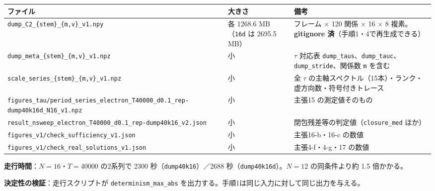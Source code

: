 \documentclass[
  10pt,
]{ltjsarticle}
\newcounter{none} %
\begin{document}
{\def\LTcaptype{none} %
\begin{longtable}[]{@{}
  >{\raggedright\arraybackslash}p{}
  >{\raggedright\arraybackslash}p{}
  >{\raggedright\arraybackslash}p{}@{}}
\toprule\noalign{}
\begin{minipage}[b]{\linewidth}\raggedright
ファイル
\end{minipage} & \begin{minipage}[b]{\linewidth}\raggedright
大きさ
\end{minipage} & \begin{minipage}[b]{\linewidth}\raggedright
備考
\end{minipage} \\
\midrule\noalign{}
\endhead
\bottomrule\noalign{}
\endlastfoot
\texttt{dump\_C2\_\{stem\}\_\{m,v\}\_v1.npy} & 各 1268.6
MB（\texttt{16d} は 2695.5 MB） & フレーム × 120 関係 × 16 × 8
複素。\textbf{gitignore 済}（手順1・4で再生成できる） \\
\texttt{dump\_meta\_\{stem\}\_\{m,v\}\_v1.npz} & 小 & \(\tau\) 対応表
\texttt{dump\_taus}、\texttt{dump\_tauc}、\texttt{dump\_stride}、関係数
\texttt{m} を含む \\
\texttt{scale\_series\_\{stem\}\_\{m,v\}\_v1.npz} & 小 & 全 \(\tau\)
の主軸スペクトル（15本）・ランク・虚方向数・符号付きトレース \\
\texttt{figures\_tau/period\_series\_electron\_T40000\_d0.1\_rep-dump40k16d\_N16\_v1.npz}
& 小 & 主張15 の測定値そのもの \\
\texttt{result\_nsweep\_electron\_T40000\_d0.1\_rep-dump40k16\_v2.json}
& 小 & 閉包残差等の判定値（\texttt{closure\_med} ほか） \\
\texttt{figures\_v1/check\_sufficiency\_v1.json} & 小 & 主張16-b・16-c
の数値 \\
\texttt{figures\_v1/check\_real\_solutions\_v1.json} & 小 &
主張4-f・4-g・17 の数値 \\
\end{longtable}
}

\textbf{走行時間}：\(N=16\)・\(T=40000\) の2系列で 2300
秒（\texttt{dump40k16}）／2688 秒（\texttt{dump40k16d}）。\(N=12\)
の同条件より約 1.5 倍かかる。

\textbf{決定性の検証}：走行スクリプトが \texttt{determinism\_max\_abs}
を出力する。手順1は同じ入力に対して同じ出力を与える。
\end{document}
